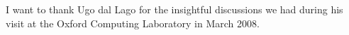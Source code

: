 I want to thank Ugo dal Lago for the insightful discussions we had
during his visit at the Oxford Computing Laboratory in March 2008.
